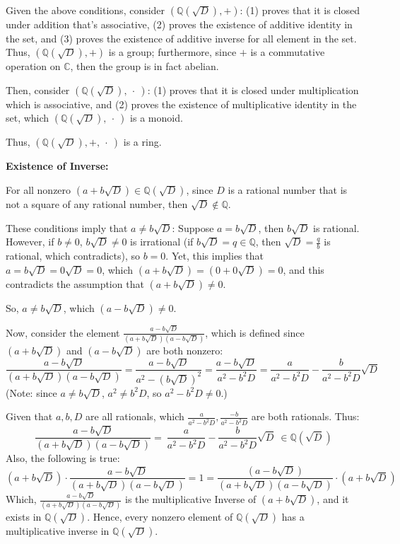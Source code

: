 \documentclass{article}
\begin{document}
Given the above conditions, consider $(\mathbb{Q}(\sqrt{D}),+)$: (1) proves that it is closed under addition that's associative,
(2) proves the existence of additive identity in the set, and (3) proves the existence of additive inverse for all element in the set.
Thus, $(\mathbb{Q}(\sqrt{D}),+)$ is a group; furthermore, since $+$ is a commutative operation on $\mathbb{C}$, then the group is in fact abelian.

Then, consider $(\mathbb{Q}(\sqrt{D}),\ \cdot\ )$: (1) proves that it is closed under multiplication which is associative, 
and (2) proves the existence of multiplicative identity in the set, which $(\mathbb{Q}(\sqrt{D}),\ \cdot\ )$ is a monoid.

Thus, $(\mathbb{Q}(\sqrt{D}),+,\ \cdot\ )$ is a ring.

\hfill

\textbf{Existence of Inverse:}

For all nonzero $(a+b\sqrt{D})\in\mathbb{Q}(\sqrt{D})$,
since $D$ is a rational number that is not a square of any rational number, then $\sqrt{D}\notin \mathbb{Q}$.

These conditions imply that $a\neq b\sqrt{D}$: Suppose $a=b\sqrt{D}$, then $b\sqrt{D}$ is rational. However, if $b\neq 0$, $b\sqrt{D}\neq 0$ is irrational (if $b\sqrt{D} = q\in\mathbb{Q}$, then $\sqrt{D}=\frac{q}{b}$ is rational, which contradicts), so $b=0$.
Yet, this implies that $a=b\sqrt{D}=0\sqrt{D} = 0$, which $(a+b\sqrt{D}) = (0+0\sqrt{D}) = 0$, and this contradicts the assumption that $(a+b\sqrt{D})\neq 0$.

So, $a\neq b\sqrt{D}$, which $(a-b\sqrt{D})\neq 0$.

\hfill

Now, consider the element $\frac{a-b\sqrt{D}}{(a+b\sqrt{D})(a-b\sqrt{D})}$, which is defined since $(a+b\sqrt{D})$ and $(a-b\sqrt{D})$ are both nonzero:
$$\frac{a-b\sqrt{D}}{(a+b\sqrt{D})(a-b\sqrt{D})}=\frac{a-b\sqrt{D}}{a^2-(b\sqrt{D})^2} = \frac{a-b\sqrt{D}}{a^2-b^2D} = \frac{a}{a^2-b^2D}-\frac{b}{a^2-b^2D}\sqrt{D}$$
(Note: since $a\neq b\sqrt{D}$, $a^2\neq b^2D$, so $a^2-b^2D \neq 0$.)

Given that $a,b,D$ are all rationals, which $\frac{a}{a^2-b^2D}, \frac{-b}{a^2-b^2D}$ are both rationals. Thus:
$$\frac{a-b\sqrt{D}}{(a+b\sqrt{D})(a-b\sqrt{D})}=\ \frac{a}{a^2-b^2D}-\frac{b}{a^2-b^2D}\sqrt{D}\ \in \mathbb{Q}(\sqrt{D})$$
Also, the following is true:
$$(a+b\sqrt{D})\cdot \frac{a-b\sqrt{D}}{(a+b\sqrt{D})(a-b\sqrt{D})} = 1 = \frac{(a-b\sqrt{D})}{(a+b\sqrt{D})(a-b\sqrt{D})}\cdot (a+b\sqrt{D})$$
Which, $\frac{a-b\sqrt{D}}{(a+b\sqrt{D})(a-b\sqrt{D})}$ is the multiplicative Inverse of $(a+b\sqrt{D})$, and it exists in $\mathbb{Q}(\sqrt{D})$.
Hence, every nonzero element of $\mathbb{Q}(\sqrt{D})$ has a multiplicative inverse in $\mathbb{Q}(\sqrt{D})$.
\end{document}
